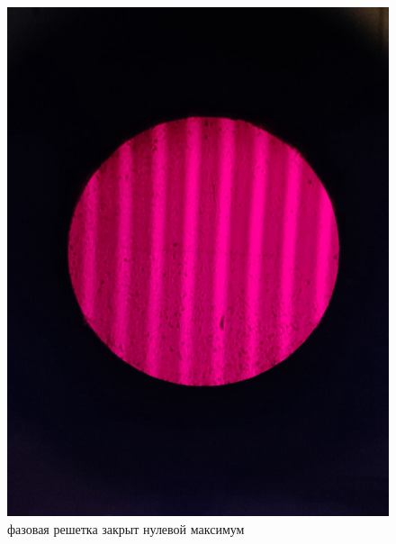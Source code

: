 	\begin{figure}
		\centering
		\includegraphics[width=0.5\linewidth]{./images/фазовая_решетка_закрыт_нулевой_максимум}
		\caption{фазовая решетка закрыт нулевой максимум}
		\label{1}
	\end{figure}

